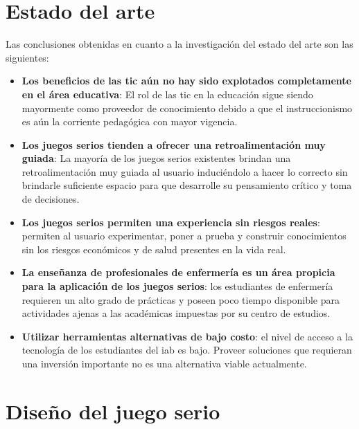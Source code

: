 \section{Estado del arte}

Las conclusiones obtenidas en cuanto a la investigación del estado del arte son 
las siguientes:

\begin{itemize}

\item \textbf{Los beneficios de las \gls{tic} aún no hay sido explotados
        completamente en el área  educativa}: El rol de las \gls{tic} en la
    educación sigue siendo mayormente como proveedor de conocimiento debido a
    que el instruccionismo es aún la corriente pedagógica con mayor vigencia.

\item \textbf{Los juegos serios tienden a ofrecer una retroalimentación muy
        guiada}: La mayoría de los juegos serios existentes brindan una
    retroalimentación muy guiada al usuario induciéndolo a hacer lo correcto sin
    brindarle suficiente espacio para que desarrolle su pensamiento crítico y
    toma de decisiones.

\item \textbf{Los juegos serios permiten una experiencia sin riesgos reales}:
    permiten  al usuario experimentar, poner a prueba y construir conocimientos
    sin los riesgos económicos y de salud presentes en la vida real.

\item \textbf{La enseñanza de profesionales de enfermería es un área propicia
        para la aplicación de los juegos serios}: los estudiantes de enfermería
    requieren un alto grado de prácticas y poseen poco tiempo disponible para
    actividades ajenas a las académicas impuestas por su centro de estudios.

\item \textbf{Utilizar herramientas alternativas de bajo costo}: el nivel de
    acceso a la tecnología de los estudiantes del \gls{iab} es bajo. Proveer
    soluciones que requieran una inversión importante no es una alternativa
    viable actualmente.

\end{itemize}

\section{Diseño del juego serio}

